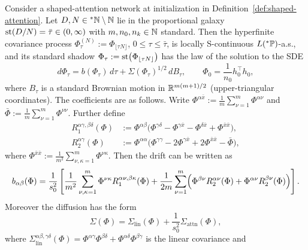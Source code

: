 \begin{theorem}
\label{thm:shaped-attn-sde}
Consider a shaped-attention network at initialization in Definition~\ref{def:shaped-attention}. Let $D, N \in {}^*\mathbb{N} \setminus \mathbb{N}$ lie in the proportional galaxy $\operatorname{st}(D/N) = \bar{\tau} \in (0, \infty)$ with $m, n_0, n_k \in \mathbb{N}$ standard. Then the hyperfinite covariance process $\Phi_\tau^{(N)} := \Phi_{\lfloor \tau N \rfloor}$, $0 \le \tau \le \bar{\tau}$, is locally S-continuous $L({}^*\mathbb{P})$-a.s., and its standard shadow $\Phi_\tau := \operatorname{st}\bigl(\Phi_{\lfloor \tau N \rfloor}\bigr)$ has the law of the solution to the SDE
\begin{equation}
\label{eq:ch6-attn-sde}
d\Phi_\tau = b(\Phi_\tau)\,d\tau + \Sigma(\Phi_\tau)^{1/2}\,dB_\tau, \qquad
\Phi_0 = \frac{1}{n_0} h_0^\top h_0,
\end{equation}
where $B_\tau$ is a standard Brownian motion in $\mathbb{R}^{m(m+1)/2}$ (upper-triangular coordinates). The coefficients are as follows. Write $\Phi^{\alpha\bar{x}} := \frac{1}{m}\sum_{\nu=1}^m \Phi^{\alpha\nu}$ and $\bar{\Phi} := \frac{1}{m}\sum_{\nu=1}^m \Phi^{\nu\nu}$. Further define
\begin{align}
R_1^{\alpha\gamma,\beta\delta}(\Phi) &:= \Phi^{\alpha\beta}\bigl(\Phi^{\gamma\delta} - \Phi^{\gamma\bar{x}} - \Phi^{\delta\bar{x}} + \Phi^{\bar{x}\bar{x}}\bigr), \label{eq:ch6-R1} \\
R_2^{\alpha\gamma}(\Phi) &:= \Phi^{\alpha\alpha}\bigl(\Phi^{\gamma\gamma} - 2\Phi^{\gamma\bar{x}} + 2\Phi^{\bar{x}\bar{x}} - \bar{\Phi}\bigr), \label{eq:ch6-R2}
\end{align}
where $\Phi^{\bar{x}\bar{x}} := \frac{1}{m^2}\sum_{\nu,\kappa=1}^m \Phi^{\nu\kappa}$. Then the drift can be written as
\begin{equation}
\label{eq:ch6-attn-drift}
b_{\alpha\beta}(\Phi) = \frac{1}{s_0^2}\left[
  \frac{1}{m^2}\sum_{\nu,\kappa=1}^m \Phi^{\nu\kappa} R_1^{\alpha\nu,\beta\kappa}(\Phi)
  + \frac{1}{2m}\sum_{\nu=1}^m \Bigl(\Phi^{\beta\nu} R_2^{\alpha\nu}(\Phi) + \Phi^{\alpha\nu} R_2^{\beta\nu}(\Phi)\Bigr)
\right].
\end{equation}
Moreover the diffusion has the form
\begin{equation}
\label{eq:ch6-attn-diff-decomp}
\Sigma(\Phi) = \Sigma_{\mathrm{lin}}(\Phi) + \frac{1}{s_0^2}\Sigma_{\mathrm{attn}}(\Phi),
\end{equation}
where $\Sigma_{\mathrm{lin}}^{\alpha\beta,\gamma\delta}(\Phi) = \Phi^{\alpha\gamma}\Phi^{\beta\delta} + \Phi^{\alpha\delta}\Phi^{\beta\gamma}$ is the linear covariance and

\end{theorem}
